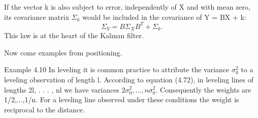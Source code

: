 If the vector k is also subject to error, independently of X and with mean zero, its
covariance matrix $\Sigma_k$ would be included in the covariance of Y = BX + k:
\begin{equation*}
\Sigma_Y=B\Sigma_XB^T+\Sigma_k.
\end{equation*}
This law is at the heart of the Kalman filter.

Now come examples from positioning.

Example 4.10\; In leveling it is common practice to attribute the variance $\sigma^2_0$ to a leveling observation of length l. According to equation (4.72), in leveling lines of lengths 2l, . . . , nl we have variances $2\sigma^2_0,...,n\sigma^2_0$. Consequently the weights are 1/2,...,1/n. For a leveling line observed under these conditions the weight is reciprocal to the distance.

